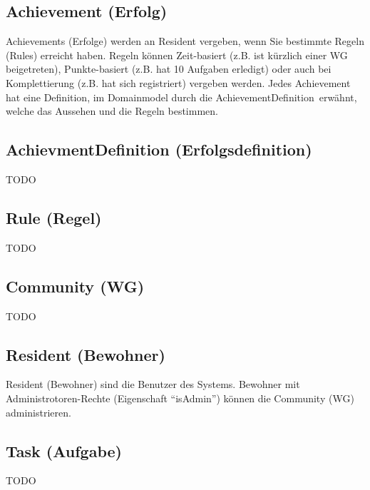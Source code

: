 \subsection*{Achievement (Erfolg)}
Achievements (Erfolge) werden an Resident vergeben, wenn Sie bestimmte Regeln (Rules) erreicht haben. Regeln können Zeit-basiert (z.B. ist kürzlich einer WG beigetreten), Punkte-basiert (z.B. hat 10 Aufgaben erledigt) oder auch bei Komplettierung (z.B. hat sich registriert) vergeben werden.
Jedes Achievement hat eine Definition, im Domainmodel durch die \flqq AchievementDefinition\frqq\ erwähnt, welche das Aussehen und die Regeln bestimmen.

\subsection*{AchievmentDefinition (Erfolgsdefinition)}
TODO

\subsection*{Rule (Regel)}
TODO

\subsection*{Community (WG)}
TODO

\subsection*{Resident (Bewohner)}
Resident (Bewohner) sind die Benutzer des Systems. Bewohner mit Administrotoren-Rechte (Eigenschaft ``isAdmin'') können die Community (WG) administrieren.

\subsection*{Task (Aufgabe)}
TODO